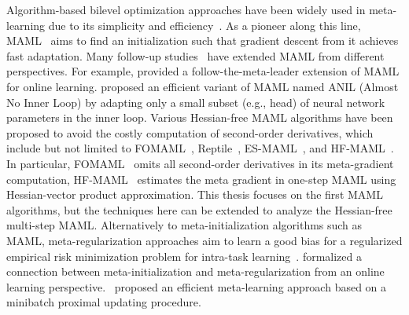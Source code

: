 \documentclass{osudissert96}
\begin{document}
 Algorithm-based bilevel optimization  approaches have been widely used in meta-learning due to its simplicity and efficiency~\cite{li2017meta,ravi2016optimization,finn2017model}. 
 As a pioneer along this line, MAML~\cite{finn2017model} aims to find an initialization such that gradient descent from it achieves fast adaptation. Many follow-up studies~\cite{grant2018recasting,finn2019online,jerfel2018online,finn2018meta,finn2018probabilistic,mi2019meta,liu2019taming,rothfuss2019promp,foerster2018dice,fallah2020convergence,raghu2020rapid, collins2020distribution} have extended MAML from different perspectives. 
 For example, \cite{finn2019online} provided a follow-the-meta-leader extension of MAML for online learning. \cite{raghu2020rapid} proposed an efficient variant of MAML named ANIL (Almost No Inner Loop) by adapting only a small subset (e.g., head) of neural network parameters in the inner loop.  Various Hessian-free MAML algorithms have been proposed to avoid  the costly computation of second-order derivatives, which include but not limited to FOMAML~\cite{finn2017model}, Reptile~\cite{nichol2018reptile}, ES-MAML~\cite{song2020simple}, and  HF-MAML~\cite{fallah2020convergence}. In particular, FOMAML~\cite{finn2017model} omits all second-order derivatives in its meta-gradient computation, HF-MAML~\cite{fallah2020convergence} estimates the meta gradient in one-step MAML using Hessian-vector product approximation.  This thesis focuses on the first MAML algorithms, but the techniques here can be extended to analyze the Hessian-free multi-step MAML. 
 Alternatively to meta-initialization algorithms such as MAML, meta-regularization approaches aim to learn a good bias for a regularized empirical risk  
minimization problem for intra-task learning~\cite{alquier2017regret, denevi2018learning,denevi2018incremental,denevi2019learning,rajeswaran2019meta,balcan2019provable,zhou2019efficient}.  
\cite{balcan2019provable} formalized a connection between meta-initialization and meta-regularization from an online learning perspective.~\cite{zhou2019efficient} proposed an efficient meta-learning approach based on a  minibatch proximal updating procedure. 
\end{document}
